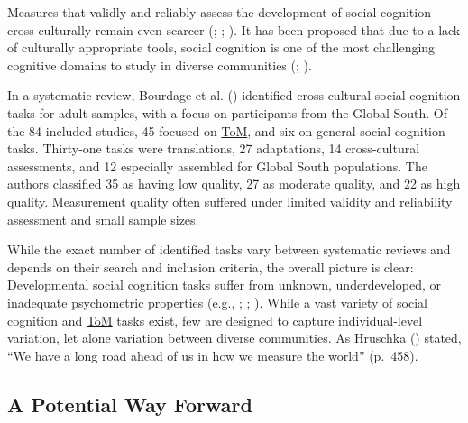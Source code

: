 \documentclass[
]{scrbook}
\begin{document}
Measures that validly and reliably assess the development of social cognition cross-culturally remain even scarcer (; ; ). It has been proposed that due to a lack of culturally appropriate tools, social cognition is one of the most challenging cognitive domains to study in diverse communities (; ).

In a systematic review, Bourdage et al. () identified cross-cultural social cognition tasks for adult samples, with a focus on participants from the Global South. Of the 84 included studies, 45 focused on \hyperref[acronyms_ToM]{ToM}, and six on general social cognition tasks. Thirty-one tasks were translations, 27 adaptations, 14 cross-cultural assessments, and 12 especially assembled for Global South populations. The authors classified 35 as having low quality, 27 as moderate quality, and 22 as high quality. Measurement quality often suffered under limited validity and reliability assessment and small sample sizes.

While the exact number of identified tasks vary between systematic reviews and depends on their search and inclusion criteria, the overall picture is clear: Developmental social cognition tasks suffer from unknown, underdeveloped, or inadequate psychometric properties (e.g., ; ; ). While a vast variety of social cognition and \hyperref[acronyms_ToM]{ToM} tasks exist, few are designed to capture individual-level variation, let alone variation between diverse communities. As Hruschka () stated, ``We have a long road ahead of us in how we measure the world'' (p.~458).

\subsection{A Potential Way Forward}\label{a-potential-way-forward}
\end{document}
